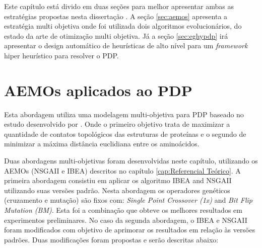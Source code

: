  Este capítulo está divido em duas seções para melhor apresentar ambas as estratégias propostas nesta dissertação . A seção \ref{sec:aemos} apresenta a estratégia multi objetiva onde foi utilizada dois algoritmos evolucionários, do estado da arte de otimização multi objetiva. Já a seção  \ref{sec:eghypdp} irá apresentar o design automático de heurísticas de alto nível para um \textit{framework} hiper heurístico para resolver o PDP.
 


\section{AEMOs aplicados ao PDP}
\label{sec:aeoms}

Esta abordagem utiliza uma modelagem multi-objetiva para PDP baseado no estudo desenvolvido por \cite{gabriel2012algoritmos}. Onde o primeiro objetivo trata de maximizar a quantidade de contatos topológicos das estruturas de proteínas e o segundo de minimizar a máxima distância euclidiana entre os aminoácidos. 

Duas abordagens multi-objetivas foram desenvolvidas neste capítulo, utilizando os AEMOs (NSGAII e IBEA) descritos no capítulo \ref{cap:Referencial Teórico}. A primeira abordagem consistiu em aplicar os algoritmo IBEA and NSGAII utilizando suas versões padrão. Nesta abordagem os operadores genéticos (cruzamento e mutação) são fixos com: \textit{Single Point Crossover (1x)} and \textit{Bit Flip Mutation (BM)}. Esta foi a combinação que obteve os melhores resultados em experimentos preliminares. No caso da segunda abordagem, o IBEA e NSGAII foram modificados com objetivo de aprimorar os resultados em relação às versões padrões. Duas modificações foram propostas e serão descritas abaixo:

